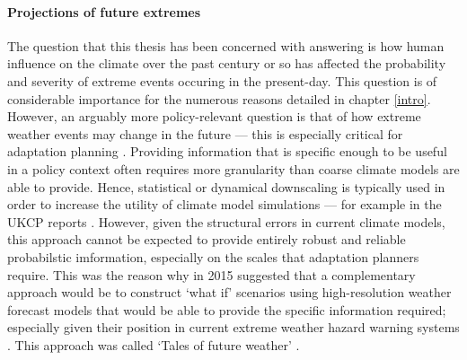     \paragraph*{Projections of future extremes}

      The question that this thesis has been concerned with answering is how human influence on the climate over the past century or so has affected the probability and severity of extreme events occuring in the present-day. This question is of considerable importance for the numerous reasons detailed in chapter \ref{intro}. However, an arguably more policy-relevant question is that of how extreme weather events may change in the future --- this is especially critical for adaptation planning \citep{harrington_integrating_2022}. Providing information that is specific enough to be useful in a policy context often requires more granularity than coarse climate models are able to provide. Hence, statistical or dynamical downscaling is typically used in order to increase the utility of climate model simulations --- for example in the UKCP reports \citep{lowe_uk_2009,murphy_uk_2009,lowe_ukcp18_2018,murphy_ukcp18_2018}. However, given the structural errors in current climate models, this approach cannot be expected to provide entirely robust and reliable probabilstic imformation, especially on the scales that adaptation planners require. This was the reason why in 2015 \citeauthor{hazeleger_tales_2015} suggested that a complementary approach would be to construct `what if' scenarios using high-resolution weather forecast models that would be able to provide the specific information required; especially given their position in current extreme weather hazard warning systems \citep{schaller_role_2020}. This approach was called `Tales of future weather' \citep{hazeleger_tales_2015}.

